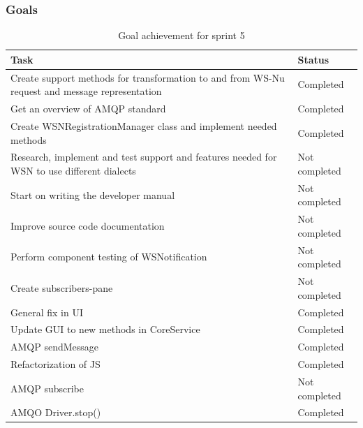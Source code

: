 \subsubsection{Goals}
\label{subsec:project_lifecycle-development-sprint_5-goals}

\begin{table}[ht!]
\small
\centering
\begin{tabular}{ | p{10cm} | p{2cm} |}
\hline
 \rowcolor{lightgray}
 \textbf{Task} & \textbf{Status} \\
\hline
\rowcolor{green!30}
Create support methods for transformation to and from WS-Nu request and message representation & Completed \\
\rowcolor{green!30}
Get an overview of AMQP standard & Completed \\
\rowcolor{green!30}
Create WSNRegistrationManager class and implement needed methods & Completed \\
\rowcolor{orange!40}
Research, implement and test support and features needed for WSN to use different dialects	& Not completed \\
\rowcolor{orange!40}
Start on writing the developer manual & Not completed \\
\rowcolor{orange!40}
Improve source code documentation & Not completed \\
\rowcolor{orange!40}
Perform component testing of WSNotification	& Not completed \\
\rowcolor{orange!40}
Create subscribers-pane	& Not completed \\
\rowcolor{green!30}
General fix in UI & Completed \\
\rowcolor{green!30}
Update GUI to new methods in CoreService & Completed \\
\rowcolor{green!30}
AMQP sendMessage & Completed \\
\rowcolor{green!30}
Refactorization of JS & Completed \\
\rowcolor{orange!40}
AMQP subscribe & Not completed \\
\rowcolor{green!30}
AMQO Driver.stop() & Completed \\
\hline
\end{tabular}
\caption{Goal achievement for sprint 5}
\label{tab:sprint 5, goals}
\end{table}

